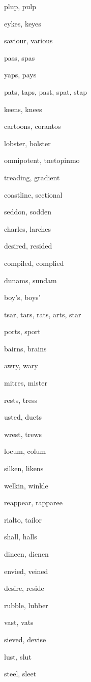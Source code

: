     \item plup, pulp
    \item eykes, keyes
    \item saviour, various
    \item pass, spas
    \item yaps, pays
    \item pats, taps, past, spat, stap
    \item keens, knees
    \item cartoons, corantos
    \item lobster, bolster
    \item omnipotent, tnetopinmo
    \item treading, gradient
    \item coastline, sectional
    \item seddon, sodden
    \item charles, larches
    \item desired, resided
    \item compiled, complied
    \item dunams, sundam
    \item boy's, boys'
    \item tsar, tars, rats, arts, star
    \item ports, sport
    \item bairns, brains
    \item awry, wary
    \item mitres, mister
    \item rests, tress
    \item usted, duets
    \item wrest, trews
    \item locum, colum
    \item silken, likens
    \item welkin, winkle
    \item reappear, rapparee
    \item rialto, tailor
    \item shall, halls
    \item dineen, dienen
    \item envied, veined
    \item desire, reside
    \item rubble, lubber
    \item vast, vats
    \item sieved, devise
    \item lust, slut
    \item steel, sleet
